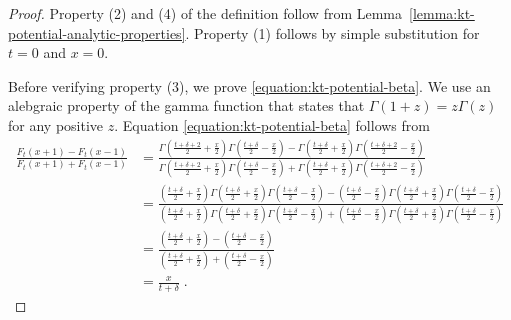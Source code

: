 \begin{proof}
Property (2) and (4) of the definition follow from
Lemma~\ref{lemma:kt-potential-analytic-properties}.
Property (1) follows by simple substitution for $t=0$ and $x=0$.

Before verifying property (3), we prove \eqref{equation:kt-potential-beta}. We
use an alebgraic property of the gamma function that states that $\Gamma(1+z) =
z \Gamma(z)$ for any positive $z$. Equation \eqref{equation:kt-potential-beta}
follows from
\begin{align*}
\frac{F_t(x + 1) - F_t(x - 1)}{F_t(x + 1) + F_t(x - 1)}
& = \frac{\Gamma(\frac{t+\delta+2}{2} + \frac{x}{2}) \Gamma(\frac{t+\delta}{2} - \frac{x}{2}) - \Gamma(\frac{t+\delta}{2} + \frac{x}{2}) \Gamma(\frac{t+\delta+2}{2} - \frac{x}{2})}{\Gamma(\frac{t+\delta+2}{2} + \frac{x}{2}) \Gamma(\frac{t + \delta}{2} - \frac{x}{2}) + \Gamma(\frac{t + \delta}{2} + \frac{x}{2}) \Gamma(\frac{t+\delta+2}{2} - \frac{x}{2})} \\
& = \frac{(\frac{t+\delta}{2} + \frac{x}{2})\Gamma(\frac{t+\delta}{2} + \frac{x}{2}) \Gamma(\frac{t+\delta}{2} - \frac{x}{2}) - (\frac{t+\delta}{2} - \frac{x}{2})\Gamma(\frac{t+\delta}{2} + \frac{x}{2}) \Gamma(\frac{t+\delta}{2} - \frac{x}{2})}{(\frac{t+\delta}{2} + \frac{x}{2})\Gamma(\frac{t+\delta}{2} + \frac{x}{2}) \Gamma(\frac{t+\delta}{2} - \frac{x}{2}) + (\frac{t+\delta}{2} - \frac{x}{2})\Gamma(\frac{t+\delta}{2} + \frac{x}{2}) \Gamma(\frac{t+\delta}{2} - \frac{x}{2})} \\
& = \frac{(\frac{t+\delta}{2} + \frac{x}{2}) - (\frac{t+\delta}{2} - \frac{x}{2})}{(\frac{t+\delta}{2} + \frac{x}{2}) + (\frac{t+\delta}{2} - \frac{x}{2})} \\
& = \frac{x}{t+\delta} \; .
\end{align*}


\end{proof}
